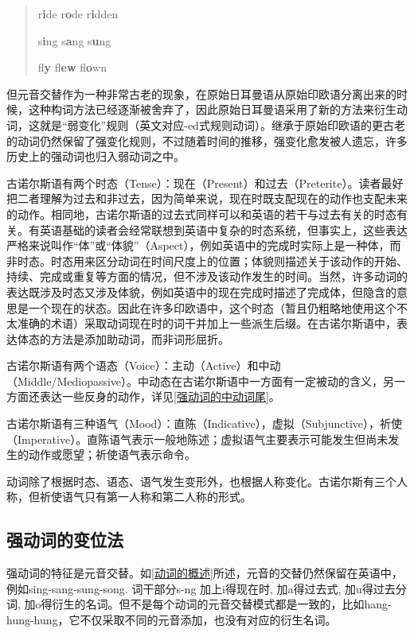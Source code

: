 \begin{quote}
r\textbf{i}de r\textbf{o}de r\textbf{i}dden

s\textbf{i}ng s\textbf{a}ng s\textbf{u}ng

fl\textbf{y} fl\textbf{ew} fl\textbf{o}wn
\end{quote}

但元音交替作为一种非常古老的现象，在原始日耳曼语从原始印欧语分离出来的时候，这种构词方法已经逐渐被舍弃了，因此原始日耳曼语采用了新的方法来衍生动词，这就是``弱变化''规则（英文对应-ed式规则动词）。继承于原始印欧语的更古老的动词仍然保留了强变化规则，不过随着时间的推移，强变化愈发被人遗忘，许多历史上的强动词也归入弱动词之中。

古诺尔斯语有两个时态（Tense）：现在（Present）和过去（Preterite）。读者最好把二者理解为过去和非过去，因为简单来说，现在时既支配现在的动作也支配未来的动作。相同地，古诺尔斯语的过去式同样可以和英语的若干与过去有关的时态有关。有英语基础的读者会经常联想到英语中复杂的时态系统，但事实上，这些表达严格来说叫作``体''或``体貌''（Aspect），例如英语中的完成时实际上是一种体，而非时态。时态用来区分动词在时间尺度上的位置；体貌则描述关于该动作的开始、持续、完成或重复等方面的情况，但不涉及该动作发生的时间。当然，许多动词的表达既涉及时态又涉及体貌，例如英语中的现在完成时描述了完成体，但隐含的意思是一个现在的状态。因此在许多印欧语中，这个时态（暂且仍粗略地使用这个不太准确的术语）采取动词现在时的词干并加上一些派生后缀。在古诺尔斯语中，表达体态的方法是添加助动词，而非词形屈折。

古诺尔斯语有两个语态（Voice）：主动（Active）和中动（Middle/Mediopassive）。中动态在古诺尔斯语中一方面有一定被动的含义，另一方面还表达一些反身的动作，详见\ref{强动词的中动词尾}。

古诺尔斯语有三种语气（Mood）：直陈（Indicative），虚拟（Subjunctive），祈使（Imperative）。直陈语气表示一般地陈述；虚拟语气主要表示可能发生但尚未发生的动作或愿望；祈使语气表示命令。

动词除了根据时态、语态、语气发生变形外，也根据人称变化。古诺尔斯有三个人称，但祈使语气只有第一人称和第二人称的形式。

\subsection{强动词的变位法}\label{强动词的变位法}

强动词的特征是元音交替。如\ref{动词的概述}所述，元音的交替仍然保留在英语中，例如sing-sang-sung-song.
词干部分s-ng 加上i得现在时, 加a得过去式, 加u得过去分词,
加o得衍生的名词。但不是每个动词的元音交替模式都是一致的，比如hang-hung-hung，它不仅采取不同的元音添加，也没有对应的衍生名词。

